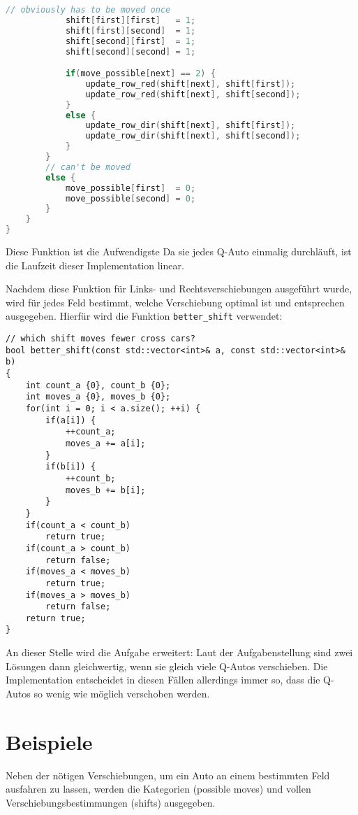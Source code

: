 \documentclass[a4paper,10pt,ngerman]{scrartcl}
\begin{document}
\begin{lstlisting}[language=C++]
            // obviously has to be moved once
            shift[first][first]   = 1;
            shift[first][second]  = 1;
            shift[second][first]  = 1;
            shift[second][second] = 1;

            if(move_possible[next] == 2) {
                update_row_red(shift[next], shift[first]);
                update_row_red(shift[next], shift[second]);
            }
            else {
                update_row_dir(shift[next], shift[first]);
                update_row_dir(shift[next], shift[second]);
            }
        }
        // can't be moved
        else {
            move_possible[first]  = 0;
            move_possible[second] = 0;
        }
    }
}
\end{lstlisting}
Diese Funktion ist die Aufwendigste
Da sie jedes Q-Auto einmalig durchläuft, ist die Laufzeit dieser Implementation linear.

Nachdem diese Funktion für Links- und Rechtsverschiebungen ausgeführt wurde, wird für jedes Feld bestimmt, welche Verschiebung optimal ist und entsprechen ausgegeben.
Hierfür wird die Funktion \lstinline{better_shift} verwendet:
\begin{lstlisting}
// which shift moves fewer cross cars?
bool better_shift(const std::vector<int>& a, const std::vector<int>& b)
{
    int count_a {0}, count_b {0};
    int moves_a {0}, moves_b {0};
    for(int i = 0; i < a.size(); ++i) {
        if(a[i]) {
            ++count_a;
            moves_a += a[i];
        }
        if(b[i]) {
            ++count_b;
            moves_b += b[i];
        }
    }
    if(count_a < count_b)
        return true;
    if(count_a > count_b)
        return false;
    if(moves_a < moves_b)
        return true;
    if(moves_a > moves_b)
        return false;
    return true;
}
\end{lstlisting}
An dieser Stelle wird die Aufgabe erweitert:
Laut der Aufgabenstellung sind zwei Lösungen dann gleichwertig, wenn sie gleich viele Q-Autos verschieben.
Die Implementation entscheidet in diesen Fällen allerdings immer so, dass die Q-Autos so wenig wie möglich verschoben werden.

\section{Beispiele}
Neben der nötigen Verschiebungen, um ein Auto an einem bestimmten Feld ausfahren zu lassen, werden die Kategorien (possible moves) und vollen Verschiebungsbestimmungen (shifts) ausgegeben.
\end{document}

